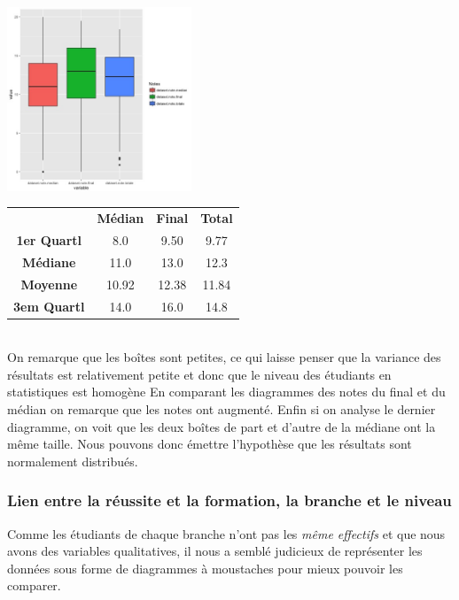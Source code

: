\documentclass[10pt]{article}
\begin{document}
	\begin{minipage}{.4\textwidth}	
		\includegraphics[width=55mm]{Figures/Notes/boxplot_exam.jpg}
		\label{fig:Boxplot_notes}
	\end{minipage}%
	\hspace{0.03\linewidth}
	\begin{minipage}{.6\textwidth}
		\begin{tabular}{ c c c c }
			\textbf{}       & \textbf{Médian} & \textbf{Final}   & \textbf{Total} \\
			\textbf{1er Quartl}    & 8.0 			       & 9.50		      & 9.77    \\
			\textbf{Médiane  }   &11.0		             & 13.0	            & 12.3    \\
			\textbf{Moyenne}     & 10.92                &  12.38          & 11.84\\
			\textbf{3em Quartl}  & 14.0  				& 16.0 		       & 14.8\\
		\end{tabular}
	\end{minipage}
	\vspace{0.2mm}
	\\On remarque que les boîtes sont petites, ce qui laisse penser que la variance des résultats est relativement petite et donc que le niveau des étudiants en statistiques est homogène  En comparant les diagrammes des notes du final et du médian on remarque que les notes ont augmenté.  Enfin si on analyse le dernier diagramme, on voit que les deux boîtes de part et d'autre de la médiane ont la même taille. Nous pouvons donc émettre l'hypothèse que les résultats sont normalement distribués. 
	
	\subsubsection{Lien entre la réussite et la formation, la branche et le niveau}
	Comme les étudiants de chaque branche n'ont pas les \textit{même effectifs} et que nous avons des variables qualitatives, il nous a semblé judicieux de représenter les données sous forme de diagrammes à moustaches pour mieux pouvoir les comparer.\\
	
\end{document}
